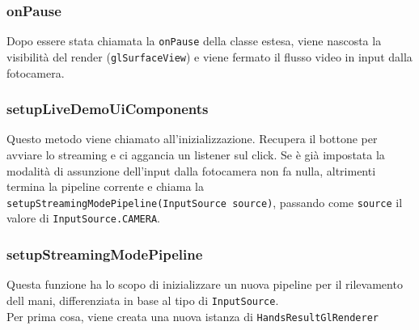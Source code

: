\subsubsection{onPause}
Dopo essere stata chiamata la \texttt{onPause} della classe estesa, viene nascosta la visibilità del render (\texttt{glSurfaceView}) e viene fermato il flusso video in input dalla fotocamera.


\subsubsection{setupLiveDemoUiComponents}
Questo metodo viene chiamato all'inizializzazione. Recupera il bottone per avviare lo streaming e ci aggancia un listener sul click. Se è già impostata la modalità di assunzione dell'input dalla fotocamera non fa nulla, altrimenti termina la pipeline corrente e chiama la \texttt{setupStreamingModePipeline(InputSource source)}, passando come \texttt{source} il valore di \texttt{InputSource.CAMERA}.


\subsubsection{setupStreamingModePipeline}
Questa funzione ha lo scopo di inizializzare un nuova pipeline per il rilevamento dell mani, differenziata in base al tipo di \texttt{InputSource}.\\
Per prima cosa, viene creata una nuova istanza di \texttt{HandsResultGlRenderer}